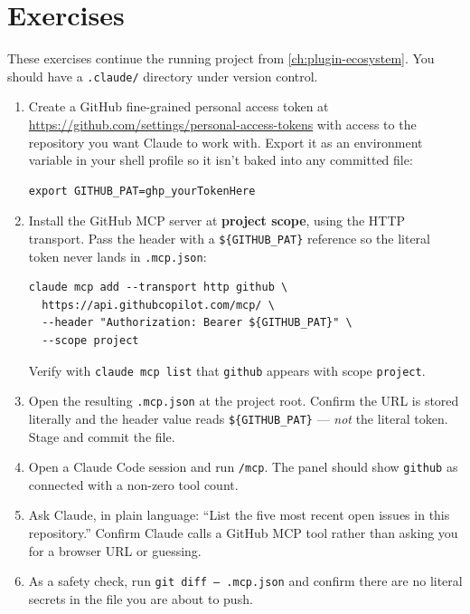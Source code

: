 \section{Exercises}
\label{sec:mcp-exercises}

\begin{exercisebox}
These exercises continue the running project from \cref{ch:plugin-ecosystem}.
You should have a \texttt{.claude/} directory under version control.

\begin{enumerate}
  \item Create a GitHub fine-grained personal access token at
        \url{https://github.com/settings/personal-access-tokens} with
        access to the repository you want Claude to work with. Export
        it as an environment variable in your shell profile so it isn't
        baked into any committed file:
\begin{verbatim}
export GITHUB_PAT=ghp_yourTokenHere
\end{verbatim}
  \item Install the GitHub MCP server at \textbf{project scope}, using
        the HTTP transport. Pass the header with a \texttt{\$\{GITHUB\_PAT\}}
        reference so the literal token never lands in
        \texttt{.mcp.json}:
\begin{verbatim}
claude mcp add --transport http github \
  https://api.githubcopilot.com/mcp/ \
  --header "Authorization: Bearer ${GITHUB_PAT}" \
  --scope project
\end{verbatim}
        Verify with \texttt{claude mcp list} that \texttt{github}
        appears with scope \texttt{project}.
  \item Open the resulting \texttt{.mcp.json} at the project root.
        Confirm the URL is stored literally and the header value reads
        \texttt{\$\{GITHUB\_PAT\}} — \emph{not} the literal token.
        Stage and commit the file.
  \item Open a Claude Code session and run \texttt{/mcp}. The panel
        should show \texttt{github} as connected with a non-zero tool
        count.
  \item Ask Claude, in plain language:
        ``List the five most recent open issues in this repository.''
        Confirm Claude calls a GitHub MCP tool rather than asking you
        for a browser URL or guessing.
  \item As a safety check, run
        \texttt{git diff -- .mcp.json} and confirm there are no
        literal secrets in the file you are about to push.
\end{enumerate}
\end{exercisebox}

